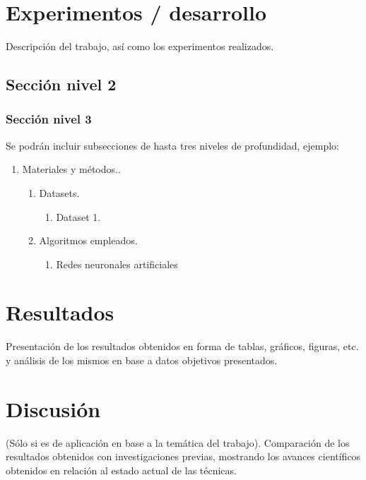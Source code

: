 \documentclass[10pt,a4paper]{article}
\begin{document}
\section{Experimentos / desarrollo}

Descripción del trabajo, así como los experimentos realizados.

\subsection{Sección nivel 2} 

\subsubsection{Sección nivel 3}
Se podrán incluir subsecciones de hasta tres niveles de profundidad, ejemplo:

\begin{enumerate}[2.]
    \item Materiales y métodos..
    \begin{enumerate}[2.1]
        \item Datasets.
        \begin{enumerate}[2.1.1]
            \item Dataset 1.
        \end{enumerate}
        \item Algoritmos empleados.
        \begin{enumerate}[2.2.1]
            \item Redes neuronales artificiales
        \end{enumerate}
    \end{enumerate}
\end{enumerate}

\section{Resultados}
Presentación de los resultados obtenidos en forma de tablas, gráficos, figuras, etc. y análisis de los mismos en base a datos objetivos presentados.

\section{Discusión}
(Sólo si es de aplicación en base a la temática del trabajo).
Comparación de los resultados obtenidos con investigaciones previas, mostrando los avances científicos obtenidos en relación al estado actual de las técnicas.
\end{document}
